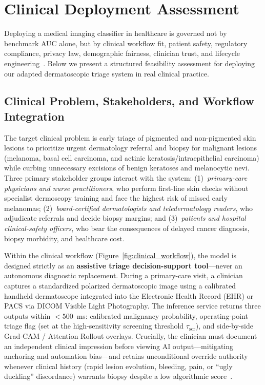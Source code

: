 \section{Clinical Deployment Assessment}
\label{sec:deployment}

Deploying a medical imaging classifier in healthcare is governed not by benchmark AUC alone, but by clinical workflow fit, patient safety, regulatory compliance, privacy law, demographic fairness, clinician trust, and lifecycle engineering~\cite{Esteva2019guide,Finlayson2021clinician}. Below we present a structured feasibility assessment for deploying our adapted dermatoscopic triage system in real clinical practice.

\subsection{Clinical Problem, Stakeholders, and Workflow Integration}
The target clinical problem is early triage of pigmented and non-pigmented skin lesions to prioritize urgent dermatology referral and biopsy for malignant lesions (melanoma, basal cell carcinoma, and actinic keratosis/intraepithelial carcinoma) while curbing unnecessary excisions of benign keratoses and melanocytic nevi. Three primary stakeholder groups interact with the system: (1)~\emph{primary-care physicians and nurse practitioners}, who perform first-line skin checks without specialist dermoscopy training and face the highest risk of missed early melanomas; (2)~\emph{board-certified dermatologists and teledermatology readers}, who adjudicate referrals and decide biopsy margins; and (3)~\emph{patients and hospital clinical-safety officers}, who bear the consequences of delayed cancer diagnosis, biopsy morbidity, and healthcare cost.

Within the clinical workflow (Figure~\ref{fig:clinical_workflow}), the model is designed strictly as an \textbf{assistive triage decision-support tool}—never an autonomous diagnostic replacement. During a primary-care visit, a clinician captures a standardized polarized dermatoscopic image using a calibrated handheld dermatoscope integrated into the Electronic Health Record (EHR) or PACS via DICOM Visible Light Photography. The inference service returns three outputs within $<500$~ms: calibrated malignancy probability, operating-point triage flag (set at the high-sensitivity screening threshold $\tau_{\text{scr}}$), and side-by-side Grad-CAM / Attention Rollout overlays. Crucially, the clinician must document an independent clinical impression before viewing AI output—mitigating anchoring and automation bias—and retains unconditional override authority whenever clinical history (rapid lesion evolution, bleeding, pain, or ``ugly duckling'' discordance) warrants biopsy despite a low algorithmic score~\cite{Tschandl2020human}.

